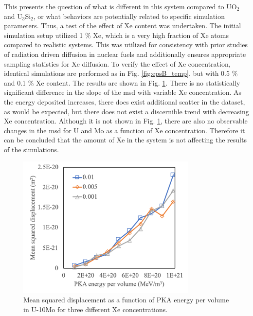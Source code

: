 \documentclass[review]{elsarticle}
\begin{document}
This presents the question of what is different in this system compared to UO$_2$ and U$_3$Si$_2$, or what behaviors are potentially related to specific simulation parameters. Thus, a test of the effect of Xe content was undertaken. The initial simulation setup utilized 1 \% Xe, which is a very high fraction of Xe atoms compared to realistic systems. This was utilized for consistency with prior studies of radiation driven diffusion in nuclear fuels and additionally ensures appropriate sampling statistics for Xe diffusion. To verify the effect of Xe concentration, identical simulations are performed as in Fig. \ref{fig:epsB_temp}, but with 0.5 \% and 0.1 \% Xe content. The results are shown in Fig. \ref{fig:xefrac}. There is no statistically significant difference in the slope of the msd with variable Xe concentration. As the energy deposited increases, there does exist additional scatter in the dataset, as would be expected, but there does not exist a discernible trend with decreasing Xe concentration. Although it is not shown in Fig. \ref{fig:xefrac}, there are also no observable changes in the msd for U and Mo as a function of Xe concentration. Therefore it can be concluded that the amount of Xe in the system is not affecting the results of the simulations.


\begin{figure}[h]
 \centering
 \includegraphics[width=0.8\textwidth]{xefrac.png} 
 \caption{Mean squared displacement as a function of PKA energy per volume in U-10Mo for three different Xe concentrations.}
 \label{fig:xefrac}
\end{figure}

\end{document}
